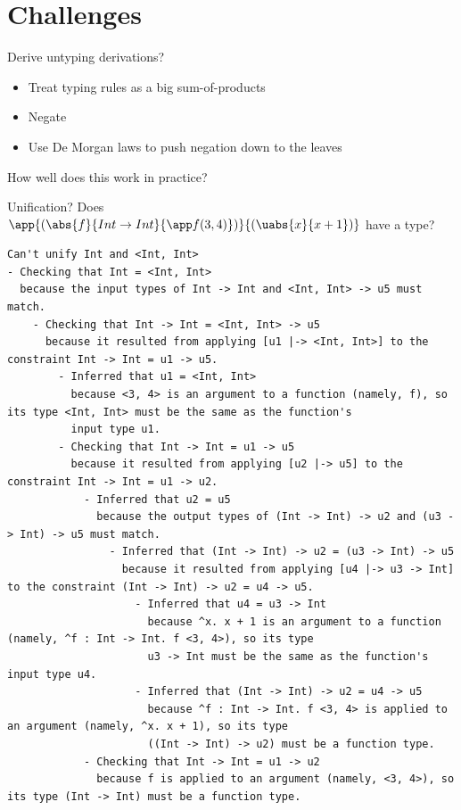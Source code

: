 \documentclass[xcolor=svgnames,12pt,aspectratio=169]{beamer}
\newenvironment{xframe}[1][]
  {\begin{frame}[fragile,environment=xframe,#1]}
  {\end{frame}}
\begin{document}
\section{Challenges}

\begin{xframe}{Derive untyping derivations?}
  \begin{itemize}
  \item<+-> Treat typing rules as a big sum-of-products
  \item<+-> Negate
  \item<+-> Use De Morgan laws to push negation down to the leaves
  \end{itemize}
  How well does this work in practice?
\end{xframe}

\begin{xframe}{Unification?}
  \small Does $\app{(\abs{f}{Int \to Int}{\app f
      {(3,4)}})}{(\uabs{x}{x+1})}$ have a type?

  \tiny
  \begin{Verbatim}
Can't unify Int and <Int, Int>
- Checking that Int = <Int, Int>
  because the input types of Int -> Int and <Int, Int> -> u5 must match.
    - Checking that Int -> Int = <Int, Int> -> u5
      because it resulted from applying [u1 |-> <Int, Int>] to the constraint Int -> Int = u1 -> u5.
        - Inferred that u1 = <Int, Int>
          because <3, 4> is an argument to a function (namely, f), so its type <Int, Int> must be the same as the function's
          input type u1.
        - Checking that Int -> Int = u1 -> u5
          because it resulted from applying [u2 |-> u5] to the constraint Int -> Int = u1 -> u2.
            - Inferred that u2 = u5
              because the output types of (Int -> Int) -> u2 and (u3 -> Int) -> u5 must match.
                - Inferred that (Int -> Int) -> u2 = (u3 -> Int) -> u5
                  because it resulted from applying [u4 |-> u3 -> Int] to the constraint (Int -> Int) -> u2 = u4 -> u5.
                    - Inferred that u4 = u3 -> Int
                      because ^x. x + 1 is an argument to a function (namely, ^f : Int -> Int. f <3, 4>), so its type
                      u3 -> Int must be the same as the function's input type u4.
                    - Inferred that (Int -> Int) -> u2 = u4 -> u5
                      because ^f : Int -> Int. f <3, 4> is applied to an argument (namely, ^x. x + 1), so its type
                      ((Int -> Int) -> u2) must be a function type.
            - Checking that Int -> Int = u1 -> u2
              because f is applied to an argument (namely, <3, 4>), so its type (Int -> Int) must be a function type.
  \end{Verbatim}
\end{xframe}
\end{document}
